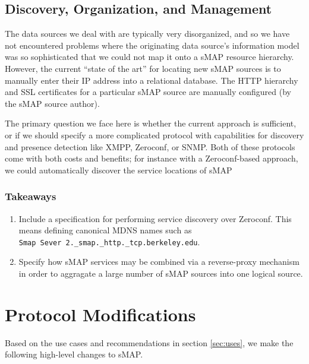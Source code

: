\documentclass[10pt,letterpaper]{article}
\newcommand{\smap}{sMAP}
\begin{document}
\subsection{Discovery, Organization, and Management}

The data sources we deal with are typically very disorganized, and so we have
not encountered problems where the originating data source's information model
was so sophisticated that we could not map it onto a \smap{} resource
hierarchy.  However, the current ``state of the art'' for locating new \smap{}
sources is to manually enter their IP address into a relational
database.  The HTTP hierarchy and SSL certificates for a particular \smap{}
source are manually configured (by the \smap{} source author).

The primary question we face here is whether the current approach is
sufficient, or if we should specify a more complicated protocol with
capabilities for discovery and presence detection like XMPP, Zeroconf, or
SNMP.  Both of these protocols come with both costs and benefits; for instance
with a Zeroconf-based approach, we could automatically discover the service
locations of \smap{}

\subsubsection{Takeaways}
\begin{enumerate}
\item Include a specification for performing service discovery over Zeroconf.
  This means defining canonical MDNS names such as \\
  {\tt Smap Sever 2.\_smap.\_http.\_tcp.berkeley.edu}.
\item Specify how \smap{} services may be combined via a reverse-proxy
  mechanism in order to aggragate a large number of \smap{} sources into one
  logical source.
\end{enumerate}

\section{Protocol Modifications}

Based on the use cases and recommendations in section \ref{sec:uses}, we make
the following high-level changes to \smap{}.
\end{document}
